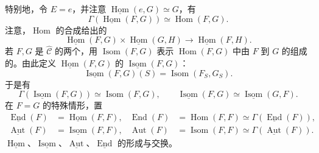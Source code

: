 特别地，令 $E=e$，并注意 $\underline{\operatorname{Hom}}(e,G)\simeq G$，有
\[
\Gamma(\underline{\operatorname{Hom}}(F,G))\simeq\operatorname{Hom}(F,G).
\]
注意，$\operatorname{Hom}$ 的合成给出的
\[
\underline{\operatorname{Hom}}(F,G)\times\underline{\operatorname{Hom}}(G,H)\longrightarrow\underline{\operatorname{Hom}}(F,H).
\]
若 $F,G$ 是 $\widehat{\mathcal C}$ 的两个，用 $\operatorname{Isom}(F,G)$ 表示 $\operatorname{Hom}(F,G)$ 中由 $F$ 到 $G$ 的组成的。由此定义 $\underline{\operatorname{Hom}}(F,G)$ 的 $\underline{\operatorname{Isom}}(F,G)$：
\[
\underline{\operatorname{Isom}}(F,G)(S)=\operatorname{Isom}(F_S,G_S).
\]
于是有
\[
\Gamma(\underline{\operatorname{Isom}}(F,G))\simeq\operatorname{Isom}(F,G),\qquad
\underline{\operatorname{Isom}}(F,G)\simeq\underline{\operatorname{Isom}}(G,F).
\]
在 $F=G$ 的特殊情形，置
\[
\begin{aligned}
\underline{\operatorname{End}}(F)&=\underline{\operatorname{Hom}}(F,F),&
\operatorname{End}(F)&=\operatorname{Hom}(F,F)\simeq\Gamma(\underline{\operatorname{End}}(F)),\\
\underline{\operatorname{Aut}}(F)&=\underline{\operatorname{Isom}}(F,F),&
\operatorname{Aut}(F)&=\operatorname{Isom}(F,F)\simeq\Gamma(\underline{\operatorname{Aut}}(F)).
\end{aligned}
\]
 $\underline{\operatorname{Hom}}$、$\underline{\operatorname{Isom}}$、$\underline{\operatorname{Aut}}$、$\underline{\operatorname{End}}$ 的形成与交换。

